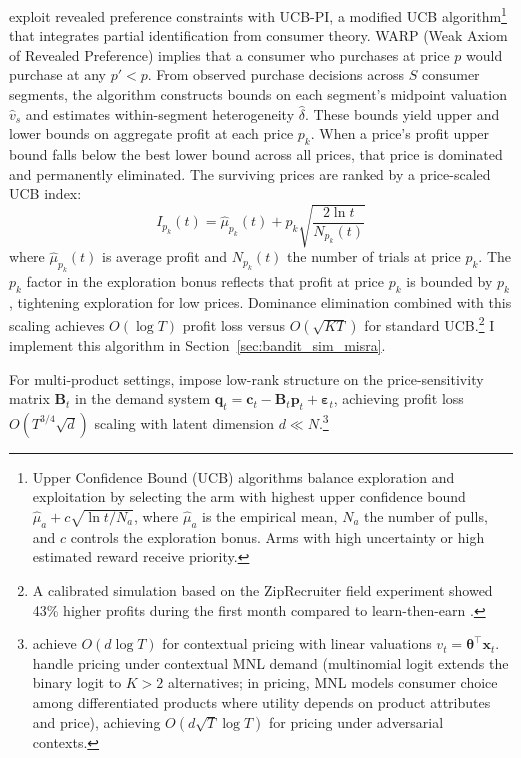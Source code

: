 \citet{Misra2019} exploit revealed preference constraints with UCB-PI, a modified UCB algorithm\footnote{Upper Confidence Bound (UCB) algorithms \citep{auer2002} balance exploration and exploitation by selecting the arm with highest upper confidence bound $\hat{\mu}_a + c\sqrt{\ln t / N_a}$, where $\hat{\mu}_a$ is the empirical mean, $N_a$ the number of pulls, and $c$ controls the exploration bonus. Arms with high uncertainty or high estimated reward receive priority.} that integrates partial identification from consumer theory. WARP (Weak Axiom of Revealed Preference) implies that a consumer who purchases at price $p$ would purchase at any $p' < p$. From observed purchase decisions across $S$ consumer segments, the algorithm constructs bounds on each segment's midpoint valuation $\hat{v}_s$ and estimates within-segment heterogeneity $\hat{\delta}$. These bounds yield upper and lower bounds on aggregate profit at each price $p_k$. When a price's profit upper bound falls below the best lower bound across all prices, that price is dominated and permanently eliminated. The surviving prices are ranked by a price-scaled UCB index:
\begin{equation}
I_{p_k}(t) = \hat{\mu}_{p_k}(t) + p_k\sqrt{\frac{2\ln t}{N_{p_k}(t)}}
\end{equation}
where $\hat{\mu}_{p_k}(t)$ is average profit and $N_{p_k}(t)$ the number of trials at price $p_k$. The $p_k$ factor in the exploration bonus reflects that profit at price $p_k$ is bounded by $p_k$, tightening exploration for low prices. Dominance elimination combined with this scaling achieves $O(\log T)$ profit loss versus $O(\sqrt{KT})$ for standard UCB.\footnote{A calibrated simulation based on the ZipRecruiter field experiment showed 43\% higher profits during the first month compared to learn-then-earn \citep{Misra2019}.} I implement this algorithm in Section~\ref{sec:bandit_sim_misra}.

For multi-product settings, \citet{Mueller2019} impose low-rank structure on the price-sensitivity matrix $\mathbf{B}_t$ in the demand system $\mathbf{q}_t = \mathbf{c}_t - \mathbf{B}_t\mathbf{p}_t + \boldsymbol{\varepsilon}_t$, achieving profit loss $O(T^{3/4}\sqrt{d})$ scaling with latent dimension $d \ll N$.\footnote{\citet{Xu2021} achieve $O(d \log T)$ for contextual pricing with linear valuations $v_t = \boldsymbol{\theta}^\top \mathbf{x}_t$. \citet{Goyal2022} handle pricing under contextual MNL demand (multinomial logit extends the binary logit to $K > 2$ alternatives; in pricing, MNL models consumer choice among differentiated products where utility depends on product attributes and price), achieving $O(d\sqrt{T}\log T)$ for pricing under adversarial contexts.}

